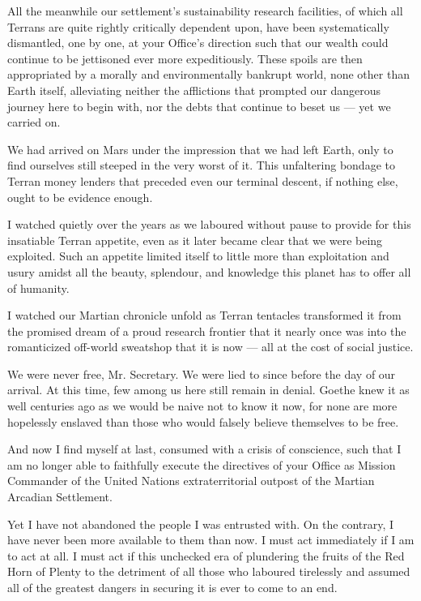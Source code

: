 All the meanwhile our settlement's sustainability research facilities, of which all Terrans are quite rightly critically dependent upon, have been systematically dismantled, one by one, at your Office's direction such that our wealth could continue to be jettisoned ever more expeditiously. These spoils are then appropriated by a morally and environmentally bankrupt world, none other than Earth itself, alleviating neither the afflictions that prompted our dangerous journey here to begin with, nor the debts that continue to beset us — yet we carried on.

We had arrived on Mars under the impression that we had left Earth, only to find ourselves still steeped in the very worst of it. This unfaltering bondage to Terran money lenders that preceded even our terminal descent, if nothing else, ought to be evidence enough.

I watched quietly over the years as we laboured without pause to provide for this insatiable Terran appetite, even as it later became clear that we were being exploited. Such an appetite limited itself to little more than exploitation and usury amidst all the beauty, splendour, and knowledge this planet has to offer all of humanity. 

I watched our Martian chronicle unfold as Terran tentacles transformed it from the promised dream of a proud research frontier that it nearly once was into the romanticized off-world sweatshop that it is now — all at the cost of social justice.

We were never free, Mr. Secretary. We were lied to since before the day of our arrival. At this time, few among us here still remain in denial. Goethe knew it as well centuries ago as we would be naive not to know it now, for none are more hopelessly enslaved than those who would falsely believe themselves to be free.

And now I find myself at last, consumed with a crisis of conscience, such that I am no longer able to faithfully execute the directives of your Office as Mission Commander of the United Nations extraterritorial outpost of the Martian Arcadian Settlement. 

Yet I have not abandoned the people I was entrusted with. On the contrary, I have never been more available to them than now. I must act immediately if I am to act at all. I must act if this unchecked era of plundering the fruits of the Red Horn of Plenty to the detriment of all those who laboured tirelessly and assumed all of the greatest dangers in securing it is ever to come to an end.

